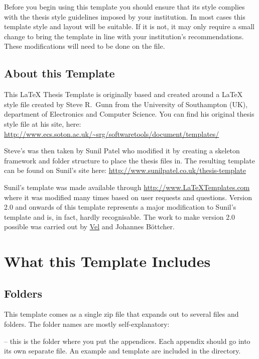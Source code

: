 Before you begin using this template you should ensure that its style complies with the thesis style guidelines imposed by your institution. In most cases this template style and layout will be suitable. If it is not, it may only require a small change to bring the template in line with your institution's recommendations. These modifications will need to be done on the  file.

\subsection{About this Template}

This \LaTeX{} Thesis Template is originally based and created around a \LaTeX{} style file created by Steve R.\ Gunn from the University of Southampton (UK), department of Electronics and Computer Science. You can find his original thesis style file at his site, here:
\url{http://www.ecs.soton.ac.uk/~srg/softwaretools/document/templates/}

Steve's  was then taken by Sunil Patel who modified it by creating a skeleton framework and folder structure to place the thesis files in. The resulting template can be found on Sunil's site here:
\url{http://www.sunilpatel.co.uk/thesis-template}

Sunil's template was made available through \url{http://www.LaTeXTemplates.com} where it was modified many times based on user requests and questions. Version 2.0 and onwards of this template represents a major modification to Sunil's template and is, in fact, hardly recognisable. The work to make version 2.0 possible was carried out by \href{mailto:vel@latextemplates.com}{Vel} and Johannes Böttcher.


\section{What this Template Includes}

\subsection{Folders}

This template comes as a single zip file that expands out to several files and folders. The folder names are mostly self-explanatory:

 -- this is the folder where you put the appendices. Each appendix should go into its own separate  file. An example and template are included in the directory.

